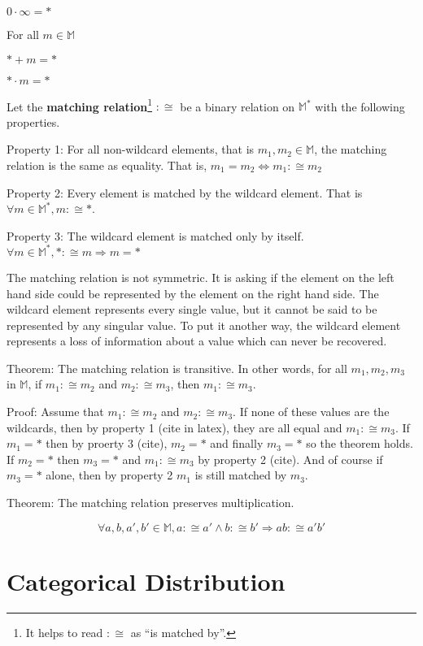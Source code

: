 \documentclass[twoside]{article}
\newcommand{\quotes}[1]{``#1''}
\begin{document}
\(0 \cdot \infty = \ast\)

For all \(m \in \mathbb{M}\)

\(\ast + m = \ast\)

\(\ast \cdot m = \ast\)

Let the \textbf{matching relation}\footnote{It helps to read \(:\cong\) as \quotes{is matched by}.} \(:\cong\) be a binary relation on \(\mathbb{M}^*\) with the following properties.

Property 1: For all non-wildcard elements, that is \(m_1, m_2 \in \mathbb{M}\), the matching relation is the same as equality. That is, \(m_1 = m_2  \Leftrightarrow m_1 :\cong m_2 \)

Property 2: Every element is matched by the wildcard element. That is \(\forall m \in \mathbb{M}^*, m :\cong \ast\).

Property 3: The wildcard element is matched only by itself. \(\forall m \in \mathbb{M}^*, \ast :\cong m \Rightarrow m = \ast\)

The matching relation is not symmetric. It is asking if the element on the left hand side could be represented by the element on the right hand side. The wildcard element represents every single value, but it cannot be said to be represented by any singular value. To put it another way, the wildcard element represents a loss of information about a value which can never be recovered.

Theorem: The matching relation is transitive. In other words, for all \(m_1, m_2, m_3\) in \(\mathbb{M}\), if \(m_1 :\cong m_2\) and \(m_2 :\cong m_3\), then \(m_1 :\cong m_3\).

Proof: Assume that \(m_1 :\cong m_2\) and \(m_2 :\cong m_3\). If none of these values are the wildcards, then by property 1 (cite in latex), they are all equal and \(m_1 :\cong m_3\). If \(m_1 = \ast\) then by proerty 3 (cite), \(m_2 = \ast\) and finally \(m_3 = \ast\) so the theorem holds. If \(m_2 = \ast\) then \(m_3 = \ast\) and \(m_1 :\cong m_3\) by property 2 (cite). And of course if \(m_3 = \ast\) alone, then by property 2 \(m_1\) is still matched by \(m_3\).

Theorem: The matching relation preserves multiplication.

\begin{equation}
\label{eq:matching_multiplication}
\forall a,b,a',b' \in \mathbb{M}, a :\cong a' \wedge b :\cong b' \Rightarrow ab :\cong a'b'
\end{equation}

\section{Categorical Distribution}
\end{document}
